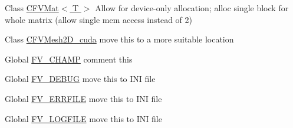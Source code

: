 \label{dd/da0/todo__todo000002}
\hypertarget{dd/da0/todo__todo000002}{}
 
\begin{DoxyDescription}
\item[Class \hyperlink{classFVL_1_1CFVMat}{CFVMat$<$ T $>$} ]Allow for device-\/only allocation; alloc single block for whole matrix (allow single mem access instead of 2) 
\end{DoxyDescription}

\label{dd/da0/todo__todo000003}
\hypertarget{dd/da0/todo__todo000003}{}
 
\begin{DoxyDescription}
\item[Class \hyperlink{structFVL_1_1CFVMesh2D__cuda}{CFVMesh2D\_\-cuda} ]move this to a more suitable location 
\end{DoxyDescription}

\label{dd/da0/todo__todo000007}
\hypertarget{dd/da0/todo__todo000007}{}
 
\begin{DoxyDescription}
\item[Global \hyperlink{FVMacros_8h_a8142e87b22064c193f2a21692cbc8e32}{FV\_\-CHAMP} ]comment this 
\end{DoxyDescription}

\label{dd/da0/todo__todo000012}
\hypertarget{dd/da0/todo__todo000012}{}
 
\begin{DoxyDescription}
\item[Global \hyperlink{FVMacros_8h_a18ca513bbb6063a08c200a208f14c2fa}{FV\_\-DEBUG} ]move this to INI file 
\end{DoxyDescription}

\label{dd/da0/todo__todo000010}
\hypertarget{dd/da0/todo__todo000010}{}
 
\begin{DoxyDescription}
\item[Global \hyperlink{FVMacros_8h_a4cb6bbc2c16d7fc7d1fb914ac4a4c8b0}{FV\_\-ERRFILE} ]move this to INI file 
\end{DoxyDescription}

\label{dd/da0/todo__todo000009}
\hypertarget{dd/da0/todo__todo000009}{}
 
\begin{DoxyDescription}
\item[Global \hyperlink{FVMacros_8h_a7b6bb00af6750cecdb196c9a8908d759}{FV\_\-LOGFILE} ]move this to INI file 
\end{DoxyDescription}

